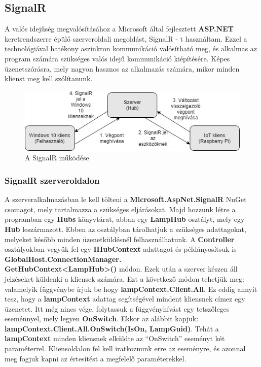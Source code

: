\documentclass[a4paper,12pt]{report}
\begin{document}
    \subsection{SignalR}
    A valós idejűség megvalósításához a Microsoft által fejlesztett \textbf{ASP.NET} keretrendszerre épülő szerveroldali megoldást,
    SignalR - t használtam. Ezzel a technológiával hatékony aszinkron kommunikáció valósítható meg, és alkalmas az program számára
    szükséges valós idejű kommunikáció kiépítésére. Képes üzenetszórásra, mely nagyon hasznos az alkalmazás számára, mikor minden klienst
    meg kell szólítanunk.\cite{SignalRWiki}

    \begin{figure}[H]
        \centering
        \includegraphics[width=\linewidth]{images/signalr.jpg}
        \caption{A SignalR működése}
        \label{fig: SignalR}
    \end{figure}

    \subsubsection{SignalR szerveroldalon}
    A szerveralkalmazásban le kell tölteni a \textbf{Microsoft.AspNet.SignalR} NuGet csomagot, mely tartalmazza a szükséges eljárásokat.
    Majd hozzunk létre a programban egy \textbf{Hubs} könyvtárat, abban egy \textbf{LampHub} osztályt, mely egy \textbf{Hub} leszármazott.
    Ebben az osztályban tárolhatjuk a szükséges adattagokat, melyeket később minden üzenetküldésnél felhasználhatunk. A \textbf{Controller}
    osztályokban vegyük fel egy \textbf{IHubContext} adattagot és példányosítsuk is \textbf{GlobalHost.ConnectionManager.\\GetHubContext<LampHub>()}
    módon. Ezek után a szerver készen áll jelzéseket küldenki a kliensek számára. Ezt a következő módon tehetjük meg: valamelyik függvénybe
    írjuk be hogy \textbf{lampContext.Client.All}. Ez eddig annyit tesz, hogy a \textbf{lampContext} adattag segítségével mindent kliensnek címez
    egy üzenetet. Itt még nincs vége, folytassuk a függvényhívást egy tetszőleges eseménnyel, mely legyen \textbf{OnSwitch}. Ekkor az alábbit kapjuk:
    \textbf{lampContext.Client.All.OnSwitch(IsOn, LampGuid)}. Tehát a \textbf{lampContext} minden kliensnek elküldte az ``OnSwitch'' eseményt két paraméterrel.
    Kliensoldalon fel kell iratkoznunk erre az eseményre, és azonnal meg fogjuk kapni az értesítést a megfelelő paraméterekkel.
\end{document}
